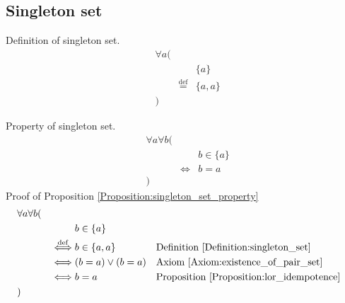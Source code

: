 \subsection{Singleton set}
\begin{defn}
\label{Definition:singleton_set}
Definition of singleton set.
\begin{align*}
& \forall a ( \\
& & & \{ a \} \\
& & \overset{\operatorname{def}}{=} & \{ a , a \} \\
& )
\end{align*}
\end{defn}

\begin{prop}
\label{Proposition:singleton_set_property}
Property of singleton set.
\begin{align*}
& \forall a \forall b ( \\
& & & b \in \{ a \} \\
& & \iff & b = a \\
& )
\end{align*}
Proof of Proposition \ref{Proposition:singleton_set_property}
\begin{align*}
& \forall a \forall b ( \\
& & & b \in \{ a \} \\
& & \overset{\operatorname{def}}{\iff} & b \in \{ a , a \}
& & \text{Definition \ref{Definition:singleton_set}} \\
& & \iff & (b = a) \lor (b = a)
& & \text{Axiom \ref{Axiom:existence_of_pair_set}} \\
& & \iff & b = a
& & \text{Proposition \ref{Proposition:lor_idempotence}} \\
& )
\end{align*}
\end{prop}

